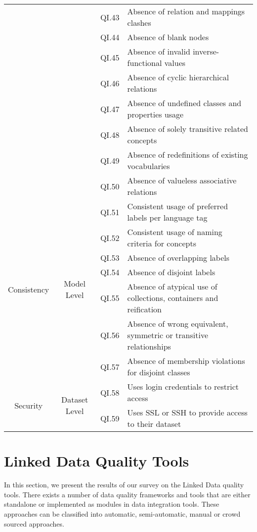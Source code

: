 \documentclass[onecolumn, crcready]{iosart2c}
\begin{document}
\begin{center}
{\begin{longtable}[h]{|c|c|c|l|}
\cline{3-4}
 &  & QI.43 & Absence of relation and mappings clashes  \cite{Suominen:2012:IQS:2413941.2413985}\tabularnewline
\cline{3-4}
 &  & QI.44 & Absence of blank nodes \cite{Hogan:2012:ESL:2263498.2264570}\tabularnewline
\cline{3-4}
 &  & QI.45 & Absence of invalid inverse-functional values \cite{Hogan2010}\tabularnewline
\cline{3-4}
 &  & QI.46 & Absence of cyclic hierarchical relations \cite{conf/jcdl/Soergel05}\cite{Suominen:2012:IQS:2413941.2413985}\cite{Mader2012}\tabularnewline
\cline{3-4}
 &  & QI.47 & Absence of undefined classes and properties usage \cite{Hogan2010}\tabularnewline
\cline{3-4}
 &  & QI.48 & Absence of solely transitive related concepts \cite{Mader2012}\tabularnewline
\cline{3-4}
 &  & QI.49 & Absence of redefinitions of existing vocabularies  \cite{Hogan2010}\tabularnewline
\cline{3-4}
 &  & QI.50 & Absence of valueless associative relations  \cite{Mader2012}\tabularnewline
\hline
\hline
\multirow{7}{*}{Consistency}
 & \multirow{7}{*}{Model Level}
& QI.51 & Consistent usage of preferred labels per language tag \cite{skosprimer}\cite{Mader2012}\tabularnewline
 \cline{3-4}
 & & QI.52 & Consistent usage of naming criteria for concepts \cite{DBLP:conf/ic3k/KeetSP13}\tabularnewline
\cline{3-4}
 &  & QI.53 & Absence of overlapping labels\tabularnewline
\cline{3-4}
 &  & QI.54 & Absence of disjoint labels \cite{Mader2012}\tabularnewline
\cline{3-4}
 & & QI.55 & Absence of atypical use of collections, containers and reification \cite{Hogan2010}\tabularnewline
\cline{3-4}
 &  & QI.56 & Absence of wrong equivalent, symmetric or transitive relationships \cite{DBLP:conf/ic3k/KeetSP13}\tabularnewline
\cline{3-4}
 &  & QI.57 & Absence of membership violations for disjoint classes \cite{Hogan2010}\tabularnewline
\hline
\hline
\multirow{2}{*}{Security} & \multirow{2}{*}{Dataset Level} & QI.58 & Uses login credentials to restrict access \cite{Framework2012}\tabularnewline
\cline{3-4}
 &  & QI.59 & Uses SSL or SSH to provide access to their dataset \cite{Framework2012}\tabularnewline
\hline
\end{longtable}
}
\end{center}

\section{Linked Data Quality Tools}
In this section, we present the results of our survey on the Linked Data quality tools. There exists a number of data quality frameworks and tools that are either standalone or implemented as modules in data integration tools. These approaches can be classified into automatic, semi-automatic, manual or crowd sourced approaches.
\end{document}
